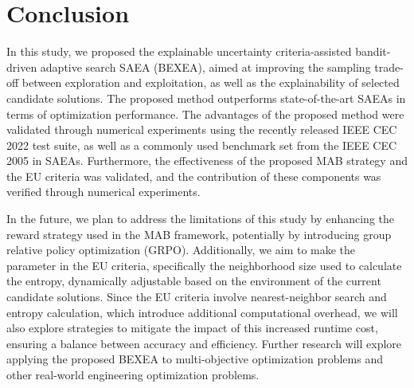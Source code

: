 \documentclass[review]{elsarticle}
\begin{document}
\section{Conclusion}
In this study, we proposed the explainable uncertainty criteria-assisted bandit-driven adaptive search SAEA (BEXEA), aimed at improving the sampling trade-off between exploration and exploitation, as well as the explainability of selected candidate solutions. The proposed method outperforms state-of-the-art SAEAs in terms of optimization performance. The advantages of the proposed method were validated through numerical experiments using the recently released IEEE CEC 2022 test suite, as well as a commonly used benchmark set from the IEEE CEC 2005 in SAEAs. Furthermore, the effectiveness of the proposed MAB strategy and the EU criteria was validated, and the contribution of these components was verified through numerical experiments.

In the future, we plan to address the limitations of this study by enhancing the reward strategy used in the MAB framework, potentially by introducing group relative policy optimization (GRPO). Additionally, we aim to make the parameter in the EU criteria, specifically the neighborhood size used to calculate the entropy, dynamically adjustable based on the environment of the current candidate solutions. Since the EU criteria involve nearest-neighbor search and entropy calculation, which introduce additional computational overhead, we will also explore strategies to mitigate the impact of this increased runtime cost, ensuring a balance between accuracy and efficiency. Further research will explore applying the proposed BEXEA to multi-objective optimization problems and other real-world engineering optimization problems.


\end{document}
